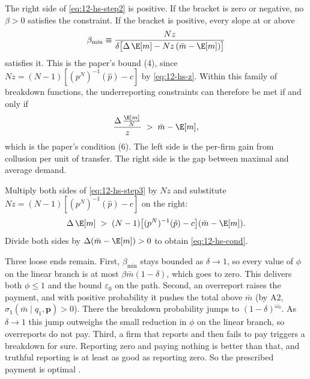 The right side of \eqref{eq:12-hs-step2} is positive. If the bracket is zero or negative, no $\beta > 0$ satisfies
the constraint. If the bracket is positive, every slope at or above
\begin{equation}\label{eq:12-hs-betamin}
  \beta_{\min} \equiv \frac{Nz}{\delta\bigl[\Delta\,\E[m] - Nz\,(\bar m - \E[m])\bigr]}
\end{equation}
satisfies it. This is the paper's bound (4), since $Nz = (N-1)[(p^N)^{-1}(\hat p) - c]$ by \eqref{eq:12-hs-z}.
Within this family of breakdown functions, the underreporting constraints can therefore be met if and only if
\begin{equation}\label{eq:12-hs-step3}
  \frac{\Delta\,\frac{\E[m]}{N}}{z} \;>\; \bar m - \E[m],
\end{equation}
which is the paper's condition (6). The left side is the per-firm gain from collusion per unit of transfer. The
right side is the gap between maximal and average demand.

Multiply both sides of \eqref{eq:12-hs-step3} by $Nz$ and substitute $Nz = (N-1)[(p^N)^{-1}(\hat p) - c]$ on the
right:
\begin{equation*}
  \Delta\,\E[m] \;>\; (N-1)\bigl[(p^N)^{-1}(\hat p) - c\bigr](\bar m - \E[m]) .
\end{equation*}
Divide both sides by $\Delta(\bar m - \E[m]) > 0$ to obtain \eqref{eq:12-hs-cond}.

Three loose ends remain. First, $\beta_{\min}$ stays bounded as $\delta \to 1$, so every value of $\phi$ on the
linear branch is at most $\beta\bar m(1-\delta)$, which goes to zero. This delivers both $\phi \le 1$ and the bound
$\varepsilon_0$ on the path. Second, an overreport raises the payment, and with positive probability it pushes the
total above $\bar m$ (by A2, $\sigma_1(\bar m \mid q_1, \mathbf{p}) > 0$). There the breakdown probability jumps
to $(1-\delta)^{\omega_0}$. As $\delta \to 1$ this jump outweighs the small reduction in $\phi$ on the linear branch,
so overreports do not pay. Third, a firm that reports and then fails to pay triggers a breakdown for sure. Reporting
zero and paying nothing is better than that, and truthful reporting is at least as good as reporting zero. So the
prescribed payment is optimal \citep[pp.~2447--2449]{HarringtonSkrzypacz2011}.

